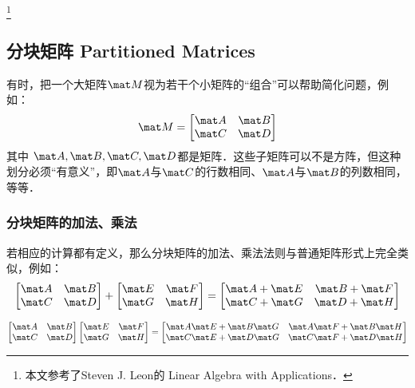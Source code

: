 
\begin{issues}
\issueDraft
\end{issues}
\footnote{本文参考了Steven J. Leon的 Linear Algebra with Applications．}

\subsection{分块矩阵 Partitioned Matrices}

有时，把一个大矩阵$\mat M$视为若干个小矩阵的“组合”可以帮助简化问题，例如：
\begin{equation}
\mat M = 
\begin{bmatrix}
\mat A & \mat B\\
\mat C & \mat D\\
\end{bmatrix}
\end{equation}
其中 $\mat A, \mat B, \mat C, \mat D$都是矩阵．这些子矩阵可以不是方阵，但这种划分必须“有意义”，即$\mat A$与$\mat C$的行数相同、$\mat A$与$\mat B$的列数相同，等等．

\subsubsection{分块矩阵的加法、乘法}
若相应的计算都有定义，那么分块矩阵的加法、乘法法则与普通矩阵形式上完全类似，例如：
\begin{equation}
\begin{bmatrix}
\mat A & \mat B\\
\mat C & \mat D\\
\end{bmatrix}
+
\begin{bmatrix}
\mat E & \mat F\\
\mat G & \mat H\\
\end{bmatrix}
=
\begin{bmatrix}
\mat A +\mat E & \mat B +\mat F\\
\mat C +\mat G & \mat D +\mat H\\
\end{bmatrix}
\end{equation}

\begin{equation}
\begin{bmatrix}
\mat A & \mat B\\
\mat C & \mat D\\
\end{bmatrix}
\begin{bmatrix}
\mat E & \mat F\\
\mat G & \mat H\\
\end{bmatrix}
=
\begin{bmatrix}
\mat A \mat E +\mat B \mat G & \mat A \mat F +\mat B \mat H \\
\mat C \mat E +\mat D \mat G  & \mat C \mat F +\mat D \mat H \\
\end{bmatrix}
\end{equation}

